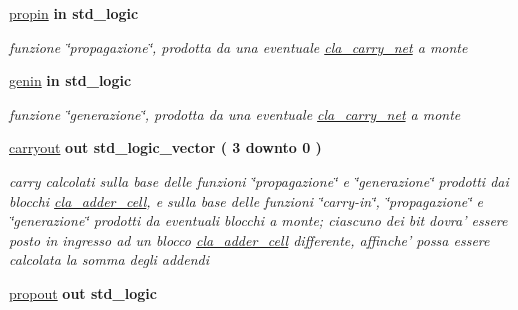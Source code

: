 \begin{DoxyCompactItemize}
\hyperlink{group___carry_network_ga422e8e7ee01fc7ac7b7390cd2ad8c87b}{propin}  {\bfseries {\bfseries \textcolor{vhdlchar}{in}\textcolor{vhdlchar}{ }}} {\bfseries \textcolor{vhdlchar}{std\+\_\+logic}\textcolor{vhdlchar}{ }} 
\begin{DoxyCompactList}\small\item\em funzione \char`\"{}propagazione\char`\"{}, prodotta da una eventuale \hyperlink{classcla__carry__net}{cla\+\_\+carry\+\_\+net} a monte \end{DoxyCompactList}\item 
\hyperlink{group___carry_network_ga0a46d5193cb73eb993bc5d4f69741d0a}{genin}  {\bfseries {\bfseries \textcolor{vhdlchar}{in}\textcolor{vhdlchar}{ }}} {\bfseries \textcolor{vhdlchar}{std\+\_\+logic}\textcolor{vhdlchar}{ }} 
\begin{DoxyCompactList}\small\item\em funzione \char`\"{}generazione\char`\"{}, prodotta da una eventuale \hyperlink{classcla__carry__net}{cla\+\_\+carry\+\_\+net} a monte \end{DoxyCompactList}\item 
\hyperlink{group___carry_network_ga6b265f3fe41195485dfedd9824c3598f}{carryout}  {\bfseries {\bfseries \textcolor{vhdlchar}{out}\textcolor{vhdlchar}{ }}} {\bfseries \textcolor{vhdlchar}{std\+\_\+logic\+\_\+vector}\textcolor{vhdlchar}{ }\textcolor{vhdlchar}{(}\textcolor{vhdlchar}{ }\textcolor{vhdlchar}{ } \textcolor{vhdldigit}{3} \textcolor{vhdlchar}{ }\textcolor{vhdlchar}{downto}\textcolor{vhdlchar}{ }\textcolor{vhdlchar}{ } \textcolor{vhdldigit}{0} \textcolor{vhdlchar}{ }\textcolor{vhdlchar}{)}\textcolor{vhdlchar}{ }} 
\begin{DoxyCompactList}\small\item\em carry calcolati sulla base delle funzioni \char`\"{}propagazione\char`\"{} e \char`\"{}generazione\char`\"{} prodotti dai blocchi \hyperlink{classcla__adder__cell}{cla\+\_\+adder\+\_\+cell}, e sulla base delle funzioni \char`\"{}carry-\/in\char`\"{}, \char`\"{}propagazione\char`\"{} e \char`\"{}generazione\char`\"{} prodotti da eventuali blocchi a monte; ciascuno dei bit dovra' essere posto in ingresso ad un blocco \hyperlink{classcla__adder__cell}{cla\+\_\+adder\+\_\+cell} differente, affinche' possa essere calcolata la somma degli addendi \end{DoxyCompactList}\item 
\hyperlink{group___carry_network_ga5957c9cdd706cafd2da8855133a002c9}{propout}  {\bfseries {\bfseries \textcolor{vhdlchar}{out}\textcolor{vhdlchar}{ }}} {\bfseries \textcolor{vhdlchar}{std\+\_\+logic}\textcolor{vhdlchar}{ }} 

\end{DoxyCompactItemize}
